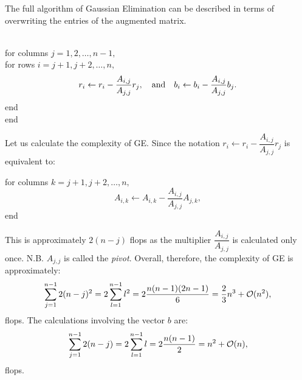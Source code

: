 The full algorithm of Gaussian Elimination can be described in terms of overwriting the entries of the augmented matrix.

\begin{algorithm}~\\
for columns $j=1,2,\ldots,n-1,$\\
\hspace*{0.75cm} for rows $i=j+1,j+2,\ldots,n,$
\[
r_i \leftarrow r_i- \dfrac{A_{i,j}}{A_{j,j}}r_j,\quad{\rm and}\quad b_i \leftarrow b_i-\dfrac{A_{i,j}}{A_{j,j}}b_j.\\
\]
\hspace*{0.75cm} end\\
end
\end{algorithm}

Let us calculate the complexity of GE. Since the notation $r_i \leftarrow r_i - \dfrac{A_{i,j}}{A_{j,j}}r_j$ is equivalent to:

for columns $k=j+1,j+2,\ldots,n,$
\[
A_{i,k} \leftarrow A_{i,k} - \dfrac{A_{i,j}}{A_{j,j}}A_{j,k},
\]
end

This is approximately $2(n-j)$ flops as the multiplier $\dfrac{A_{i,j}}{A_{j,j}}$ is calculated only once. N.B. $A_{j,j}$ is called the {\em pivot}. Overall, therefore, the complexity of GE is approximately:
\[
\sum_{j=1}^{n-1} 2(n-j)^2 = 2\sum_{l=1}^{n-1}l^2 = 2\dfrac{n(n-1)(2n-1)}{6} = \dfrac{2}{3}n^3+\mathcal{O}(n^2),
\]
flops. The calculations involving the vector $b$ are:
\[
\sum_{j=1}^{n-1}2(n-j) = 2\sum_{l=1}^{n-1}l = 2\dfrac{n(n-1)}{2} = n^2+\mathcal{O}(n),
\]
flops.

